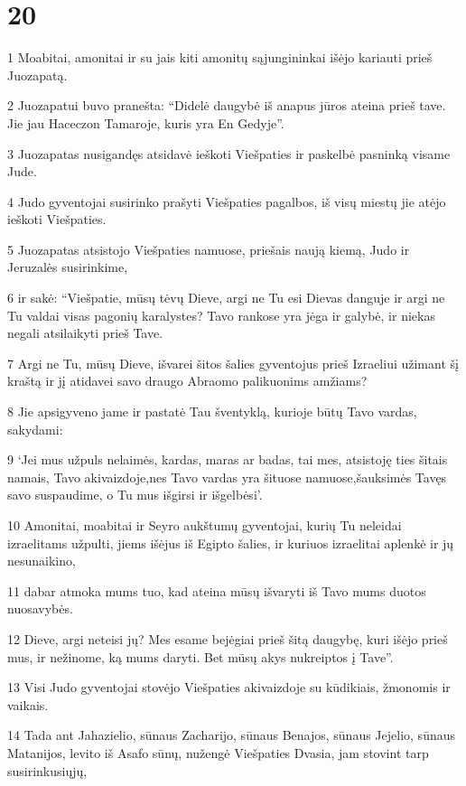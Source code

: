 \chapter{20}


\par 1 Moabitai, amonitai ir su jais kiti amonitų sąjungininkai išėjo kariauti prieš Juozapatą. 
\par 2 Juozapatui buvo pranešta: “Didelė daugybė iš anapus jūros ateina prieš tave. Jie jau Haceczon Tamaroje, kuris yra En Gedyje”. 
\par 3 Juozapatas nusigandęs atsidavė ieškoti Viešpaties ir paskelbė pasninką visame Jude. 
\par 4 Judo gyventojai susirinko prašyti Viešpaties pagalbos, iš visų miestų jie atėjo ieškoti Viešpaties. 
\par 5 Juozapatas atsistojo Viešpaties namuose, priešais naują kiemą, Judo ir Jeruzalės susirinkime, 
\par 6 ir sakė: “Viešpatie, mūsų tėvų Dieve, argi ne Tu esi Dievas danguje ir argi ne Tu valdai visas pagonių karalystes? Tavo rankose yra jėga ir galybė, ir niekas negali atsilaikyti prieš Tave. 
\par 7 Argi ne Tu, mūsų Dieve, išvarei šitos šalies gyventojus prieš Izraeliui užimant šį kraštą ir jį atidavei savo draugo Abraomo palikuonims amžiams? 
\par 8 Jie apsigyveno jame ir pastatė Tau šventyklą, kurioje būtų Tavo vardas, sakydami: 
\par 9 ‘Jei mus užpuls nelaimės, kardas, maras ar badas, tai mes, atsistoję ties šitais namais, Tavo akivaizdoje,­nes Tavo vardas yra šituose namuose,­šauksimės Tavęs savo suspaudime, o Tu mus išgirsi ir išgelbėsi’. 
\par 10 Amonitai, moabitai ir Seyro aukštumų gyventojai, kurių Tu neleidai izraelitams užpulti, jiems išėjus iš Egipto šalies, ir kuriuos izraelitai aplenkė ir jų nesunaikino, 
\par 11 dabar atmoka mums tuo, kad ateina mūsų išvaryti iš Tavo mums duotos nuosavybės. 
\par 12 Dieve, argi neteisi jų? Mes esame bejėgiai prieš šitą daugybę, kuri išėjo prieš mus, ir nežinome, ką mums daryti. Bet mūsų akys nukreiptos į Tave”. 
\par 13 Visi Judo gyventojai stovėjo Viešpaties akivaizdoje su kūdikiais, žmonomis ir vaikais. 
\par 14 Tada ant Jahazielio, sūnaus Zacharijo, sūnaus Benajos, sūnaus Jejelio, sūnaus Matanijos, levito iš Asafo sūnų, nužengė Viešpaties Dvasia, jam stovint tarp susirinkusiųjų, 
